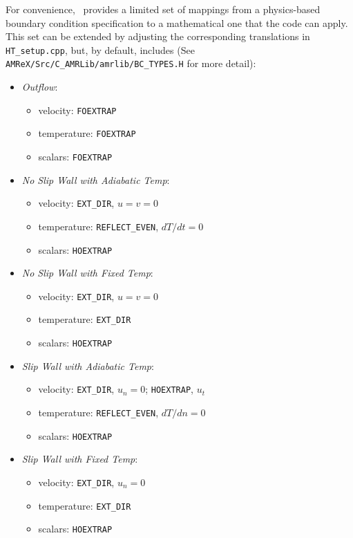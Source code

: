 For convenience, \iamr\ provides a limited set of mappings from a physics-based boundary condition
specification to a mathematical one that the code can apply.  This set can be extended
by adjusting the corresponding translations in {\tt HT\_setup.cpp}, but, by default, includes 
(See {\tt AMReX/Src/C\_AMRLib/amrlib/BC\_TYPES.H} for more detail):
\begin{itemize}
\item {\it Outflow}:
  \begin{itemize}
    \item velocity: {\tt FOEXTRAP}
    \item temperature: {\tt FOEXTRAP}
    \item scalars: {\tt FOEXTRAP}
  \end{itemize}
  
\item {\it No Slip Wall with Adiabatic Temp}:
  \begin{itemize}
  \item velocity: {\tt EXT\_DIR}, $u=v=0$
  \item temperature: {\tt REFLECT\_EVEN}, $dT/dt=0$
  \item scalars: {\tt HOEXTRAP}
  \end{itemize}

\item {\it No Slip Wall with Fixed Temp}:
  \begin{itemize}
  \item velocity: {\tt EXT\_DIR}, $u=v=0$
  \item temperature: {\tt EXT\_DIR}
  \item scalars: {\tt HOEXTRAP}
  \end{itemize}
    
\item {\it Slip Wall with Adiabatic Temp}:
  \begin{itemize}
  \item velocity: {\tt EXT\_DIR}, $u_n=0$; {\tt HOEXTRAP}, $u_t$
  \item temperature: {\tt REFLECT\_EVEN}, $dT/dn=0$
  \item scalars: {\tt HOEXTRAP}
  \end{itemize}
  
\item {\it Slip Wall with Fixed Temp}:
  \begin{itemize}
  \item velocity: {\tt EXT\_DIR}, $u_n=0$
  \item temperature: {\tt EXT\_DIR}
  \item scalars: {\tt HOEXTRAP}
  \end{itemize}

\end{itemize}

